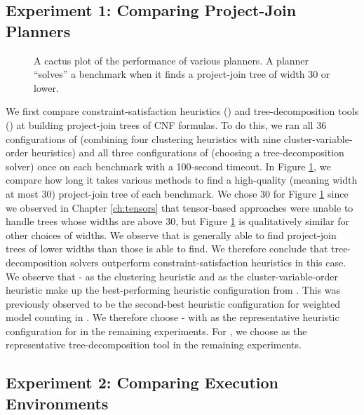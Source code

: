 \subsection{Experiment 1: Comparing Project-Join Planners}
\label{sec_experiments_planning}

\begin{figure}[t]
	\centering
	
    \vspace*{-1cm}
	\caption{\label{fig:planning} A cactus plot of the performance of various planners.
	A planner ``solves'' a benchmark when it finds a project-join tree of width 30 or lower.}
\end{figure}

We first compare constraint-satisfaction heuristics (\Htb) and tree-decomposition tools (\Lg) at building project-join trees of CNF formulas.
To do this, we ran all 36 configurations of \Htb{} (combining four clustering heuristics with nine cluster-variable-order heuristics) and all three configurations of \Lg{} (choosing a tree-decomposition solver) once on each benchmark with a 100-second timeout.
In Figure \ref{fig:planning}, we compare how long it takes various methods to find a high-quality (meaning width at most 30) project-join tree of each benchmark.
We chose 30 for Figure \ref{fig:planning} since we observed in Chapter \ref{ch:tensors} that tensor-based approaches were unable to handle trees whose widths are above 30, but Figure \ref{fig:planning} is qualitatively similar for other choices of widths.
We observe that \Lg{} is generally able to find project-join trees of lower widths than those \Htb{} is able to find.
We therefore conclude that tree-decomposition solvers outperform constraint-satisfaction heuristics in this case.
We observe that \Be-\TreeH{} as the clustering heuristic and \Invlexp{} as the cluster-variable-order heuristic make up the best-performing heuristic configuration from \Htb.
This was previously observed to be the second-best heuristic configuration for weighted model counting in \cite{DPV20}.
We therefore choose \Be-\TreeH{} with \Invlexp{} as the representative heuristic configuration for \Htb{} in the remaining experiments.
For \Lg{}, we choose \Flowcutter{} as the representative tree-decomposition tool in the remaining experiments.


\subsection{Experiment 2: Comparing Execution Environments}
\label{sec_experiments_execution}

